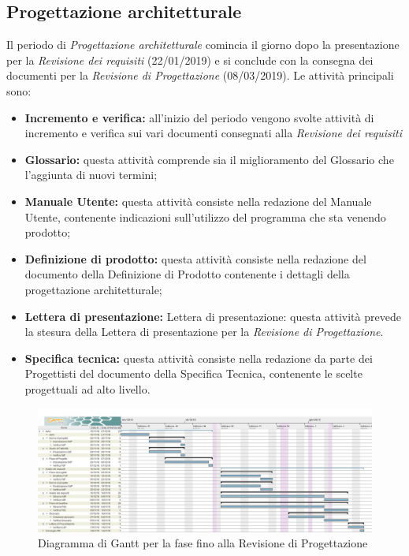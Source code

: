 \subsection{Progettazione architetturale}
Il periodo di \textit{Progettazione architetturale} comincia il giorno dopo la presentazione per la \textit{Revisione dei requisiti} (22/01/2019) e si conclude con la consegna dei documenti per la \textit{Revisione di Progettazione} (08/03/2019). Le attività principali sono:
\begin{itemize}
	\item{\textbf{Incremento e verifica:} all'inizio del periodo vengono svolte attività di incremento e verifica sui vari documenti consegnati alla \textit{Revisione dei requisiti}}
	\item{\textbf{Glossario:} questa attività comprende sia il miglioramento del Glossario che l’aggiunta di nuovi termini;}
	\item{\textbf{Manuale Utente:}  questa attività consiste nella redazione del Manuale Utente, contenente indicazioni sull’utilizzo del programma che sta venendo prodotto;}
	\item{\textbf{Definizione di prodotto:} questa attività consiste nella redazione del documento della Definizione di Prodotto contenente i dettagli della progettazione architetturale;}
	\item{\textbf{Lettera di presentazione:} Lettera di presentazione: questa attività prevede la stesura della Lettera di presentazione per la \textit{Revisione di Progettazione}.}
	\item{\textbf{Specifica tecnica:} questa attività consiste nella redazione da parte dei Progettisti del documento della Specifica Tecnica, contenente le scelte progettuali ad alto livello.}
\end{itemize}

\begin{figure}[h!]
	\centering
	\includegraphics[width=\textwidth]{Gantt_seconda_fase.jpg}
	\caption{Diagramma di Gantt per la fase fino alla Revisione di Progettazione}
\end{figure}


